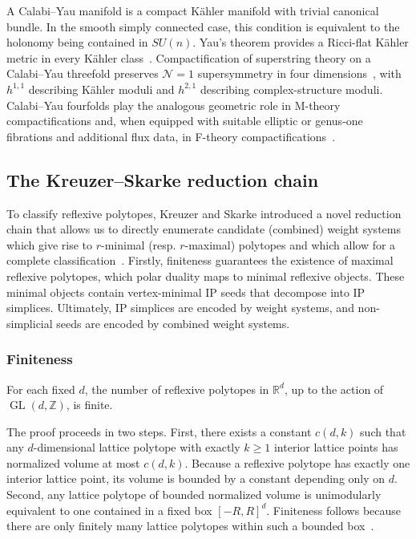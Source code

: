\documentclass[appliedmath,article,submit,moreauthors]{Definitions/mdpi}
\newcommand{\Z}{\mathbb{Z}}
\newcommand{\GL}{\operatorname{GL}}
\newcommand{\RR}{\mathbb{R}}
\begin{document}
\begin{Remark}
A Calabi--Yau manifold is a compact K\"ahler manifold with trivial canonical
bundle. In the smooth simply connected case, this condition is equivalent to the
holonomy being contained in \(SU(n)\). Yau's theorem provides a Ricci-flat
K\"ahler metric in every K\"ahler class~\cite{Yau1978}. Compactification of
superstring theory on a Calabi--Yau threefold preserves \(\mathcal{N}=1\)
supersymmetry in four dimensions~\cite{Candelas1985}, with \(h^{1,1}\)
describing K\"ahler moduli and \(h^{2,1}\) describing complex-structure moduli.
Calabi--Yau fourfolds play the analogous geometric role in M-theory
compactifications and, when equipped with suitable elliptic or genus-one
fibrations and additional flux data, in F-theory
compactifications~\cite{Vafa1996,BeckerBecker1996,BrunnerSchimmrigk1996,Weigand2018}.
\end{Remark}



\subsection{The Kreuzer--Skarke reduction chain}
\label{sec:math-chain}

To classify reflexive polytopes, Kreuzer and Skarke introduced a novel reduction
chain that allows us to directly enumerate candidate (combined) weight systems
which give rise to $r$-minimal (resp. $r$-maximal) polytopes and which allow for
a complete classification~\cite{KS97,KreuzerSkarke2000,KSFibrations2002}.
Firstly, finiteness guarantees the existence of maximal reflexive polytopes,
which polar duality maps to minimal reflexive objects. These minimal objects
contain vertex-minimal IP seeds that decompose into IP simplices. Ultimately, IP
simplices are encoded by weight systems, and non-simplicial seeds are encoded by
combined weight systems.

\subsubsection{Finiteness}
\label{sec:math-finite}

\begin{Theorem}
\label{thm:finite}
For each fixed \(d\), the number of reflexive polytopes in \(\RR^d\), up to the
action of \(\GL(d,\Z)\), is finite.
\end{Theorem}

The proof proceeds in two steps. First, there exists a constant $c(d,k)$ such
that any $d$-dimensional lattice polytope with exactly $k\geq 1$ interior
lattice points has normalized volume at most $c(d,k)$. Because a reflexive
polytope has exactly one interior lattice point, its volume is bounded by a
constant depending only on $d$. Second, any lattice polytope of bounded
normalized volume is unimodularly equivalent to one contained in a fixed box
$[-R,R]^d$. Finiteness follows because there are only finitely many lattice
polytopes within such a bounded box~\cite{Hensley1983,LagariasZiegler1991}.
\end{document}
